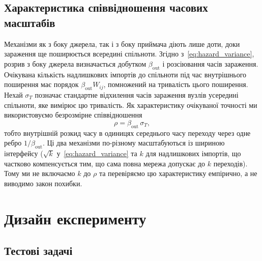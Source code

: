 \subsection{Характеристика співвідношення часових масштабів}
\label{sec:descriptor}

Механізми як з боку джерела, так і з боку приймача діють лише доти, доки зараження ще поширюється всередині спільноти. Згідно з~\eqref{eq:hazard_variance}, розрив з боку джерела визначається добутком $\beta_{\mathrm{out}}$ і розсіювання часів зараження. Очікувана кількість надлишкових імпортів до спільноти під час внутрішнього поширення має порядок $\beta_{\mathrm{out}}W_{ij}$, помножений на тривалість цього поширення. Нехай $\sigma_T$ позначає стандартне відхилення часів зараження вузлів усередині спільноти, яке вимірює цю тривалість. Як характеристику очікуваної точності ми використовуємо безрозмірне співвідношення
\begin{equation}
\label{eq:rho}
\rho=\beta_{\mathrm{out}}\,\sigma_T,
\end{equation}
тобто внутрішній розкид часу в одиницях середнього часу переходу через одне ребро $1/\beta_{\mathrm{out}}$. Ці два механізми по-різному масштабуються із шириною інтерфейсу ($\sqrt{k}$ у~\eqref{eq:hazard_variance} та $k$ для надлишкових імпортів, що частково компенсується тим, що сама повна мережа допускає до $k$ переходів). Тому ми не включаємо $k$ до $\rho$ та перевіряємо цю характеристику емпірично, а не виводимо закон похибки.

\section{Дизайн експерименту}
\label{sec:design}

\subsection{Тестові задачі}

